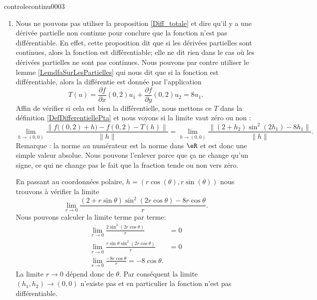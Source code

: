 \begin{corrige}{controlecontinu0003}
\begin{enumerate}
            \item
                 Nous ne pouvons pas utiliser la proposition \ref{Diff_totale} et dire qu'il y a une dérivée partielle non continue pour conclure que la fonction n'est pas différentiable. En effet, cette proposition dit que si les dérivées partielles sont continues, alors la fonction est différentiable; elle ne dit rien dans le cas où les dérivées partielles ne sont pas continues. Nous pouvons par contre utiliser le lemme \ref{LemdfaSurLesPartielles} qui nous dit que si la fonction est différentiable, alors la différentie est donnée par l'application
                \begin{equation}
                    T(u)=\frac{ \partial f }{ \partial x }(0,2)u_1+\frac{ \partial f }{ \partial y }(0,2)u_2=8u_1.
                \end{equation}
                Affin de vérifier si cela est bien la différentielle, nous mettons ce \( T\) dans la définition \ref{DefDifferentiellePta} et nous voyons si la limite vaut zéro ou non :
                \begin{equation}
                        \lim_{h\to (0,0)} \frac{ \| f\big( (0,2)+h \big)-f(0,2)-T(h) \| }{ \| h \| }=\lim_{h\to (0,0)} \frac{ \| (2+h_2)\sin^2(2h_1)-8h_1 \| }{ \| h \| }.
                \end{equation}
                Remarque : la norme au numérateur est la norme dans \( \eR\) et est donc une simple valeur absolue. Nous pouvons l'enlever parce que ça ne change qu'un signe, ce qui ne change pas le fait que la fraction tende ou non vers zéro.

                En passant au coordonnées polaire, \( h=(r\cos(\theta),r\sin(\theta))\) nous trouvons à vérifier la limite
                \begin{equation}
                    \lim_{r\to 0} \frac{ (2+r\sin\theta)\sin^2(2r\cos\theta)-8r\cos\theta }{ r }.
                \end{equation}
                Nous pouvons calculer la limite terme par terme:
                \begin{subequations}
                    \begin{align}
                        \lim_{r\to 0} \frac{ 2\sin^2(2r\cos\theta) }{ r }&=0\\
                        \lim_{r\to 0} \frac{  r\sin\theta\sin^2(2r\cos\theta)}{r}&=0\\
                        \lim_{r\to 0} \frac{ -8r\cos\theta }{ r }=-8\cos\theta.
                    \end{align}
                \end{subequations}
                La limite \( r\to 0\) dépend donc de \( \theta\). Par conséquent la limite \( (h_1,h_2)\to(0,0)\) n'existe pas et en particulier la fonction n'est pas différentiable.
            
    \end{enumerate}

\end{corrige}

